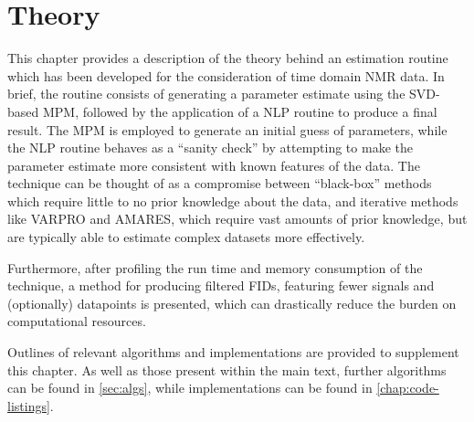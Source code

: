 \chapter{Theory}
\label{chap:theory}

This chapter provides a description of the theory behind an estimation
routine which has been developed for the consideration of time domain \ac{NMR}
data.
In brief, the routine consists of generating a parameter estimate using the
\ac{SVD}-based \ac{MPM}, followed by the application of a \ac{NLP} routine to
produce a final result. The \ac{MPM} is employed to generate an initial
guess of parameters, while the \ac{NLP} routine behaves as a ``sanity
check'' by attempting to make the parameter estimate more consistent with
known features of the data. The technique can be thought of as a compromise
between ``black-box'' methods which require little to no prior knowledge about
the data, and iterative methods like \ac{VARPRO} and \ac{AMARES}, which require
vast amounts of prior knowledge, but are typically able to estimate
complex datasets more effectively.

Furthermore, after profiling the run time and memory consumption of the
technique, a method for producing filtered \acp{FID}, featuring fewer signals
and (optionally) datapoints is presented, which can drastically reduce the
burden on computational resources.

Outlines of relevant algorithms and \Python implementations are
provided to supplement this chapter. As well as those present
within the main text, further algorithms can be found in \cref{sec:algs}, while
\Python implementations can be found in \cref{chap:code-listings}.







